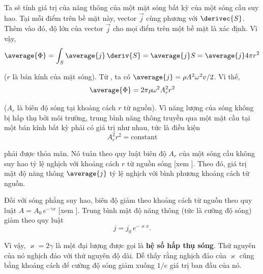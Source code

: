 Ta sẽ tính giá trị của năng thông của một mặt sóng bất kỳ của một sóng cầu suy hao. Tại mỗi điểm trên bề mặt này, vector $\vec{j}$ cùng phương với $\derivec{S}$. Thêm vào đó, độ lớn của vector $\vec{j}$ cho mọi điểm trên một bề mặt là xác định. Vì vậy,
\begin{equation*}
	\average{\Phi} = \int_S \average{j}\, \deriv{S} = \average{j} S = \average{j} 4\pi r^2
\end{equation*}

\noindent
($r$ là bán kính của mặt sóng). Từ , ta có $\average{j}=\rho A^2\omega^2v/2$. Vì thế,
\begin{equation*}
	\average{\Phi} = 2\pi \rho \omega^2 A_r^2 r^2
\end{equation*}

\noindent
($A_r$ là biên độ sóng tại khoảng cách $r$ từ nguồn). Vì năng lượng của sóng không bị hấp thụ bởi môi trường, trung bình năng thông truyền qua một mặt cầu tại một bán kính bất kỳ phải có giá trị như nhau, tức là điều kiện
\begin{equation*}
	A_r^2 r^2 = \text{constant}
\end{equation*}

\noindent
phải được thỏa mãn. Nó tuân theo quy luật biên độ $A_r$ của một sóng cầu không suy hao tỷ lệ nghịch với khoảng cách $r$ từ nguồn sóng [xem ]. Theo đó, giá trị mật độ năng thông $\average{j}$ tỷ lệ nghịch với bình phương khoảng cách từ nguồn.

Đối với sóng phẳng suy hao, biên độ giảm theo khoảng cách từ nguồn theo quy luật $A= A_0\,e^{-\gamma x}$ [xem ]. Trung bình mật độ năng thông (tức là cường độ sóng) giảm theo quy luật
\begin{equation}\label{eq:14_52}
	j = j_0\, e^{-\varkappa x}.
\end{equation}

\noindent
Vì vậy, $\varkappa = 2\gamma$ là một đại lượng được gọi là \textbf{hệ số hấp thụ sóng}. Thứ nguyên của nó nghịch đảo với thứ nguyên độ dài. Dễ thấy rằng nghịch đảo của $\varkappa$ cũng bằng khoảng cách để cường độ sóng giảm xuống $1/e$ giá trị ban đầu của nó.

